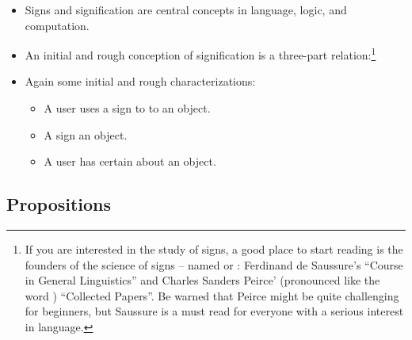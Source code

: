 \documentclass[11pt]{article}
\begin{document}
\begin{itemize}
\item Signs and signification are central concepts in language, logic, and
computation.

\item An initial and rough conception of signification is a three-part
relation:\footnote{If you are interested in the study of signs, a good place
to start reading is the founders of the science of signs -- named
 or : Ferdinand de Saussure's ``Course
in General Linguistics'' and Charles Sanders Peirce' (pronounced like the
word ) ``Collected Papers''. Be warned that Peirce might be
quite challenging for beginners, but Saussure is a must read for everyone with a
serious interest in language.}


\item Again some initial and rough characterizations: 
	\begin{itemize}
	\item A user uses a sign to  to an object.
 	\item A sign  an object.
	\item A user has certain  about an object. 
	\end{itemize}
\end{itemize}


\subsection{Propositions}
\end{document}
